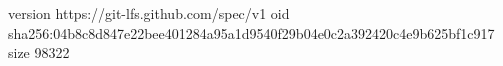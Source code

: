 version https://git-lfs.github.com/spec/v1
oid sha256:04b8c8d847e22bee401284a95a1d9540f29b04e0c2a392420c4e9b625bf1c917
size 98322
